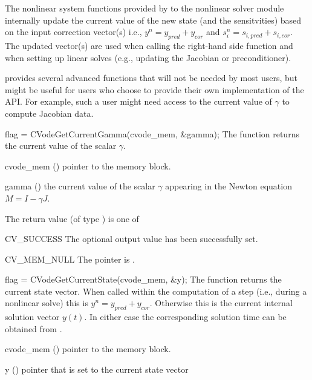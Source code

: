 The nonlinear system functions provided by {\cvodes} to the nonlinear solver
module internally update the current value of the new state (and the
sensitvities) based on the input correction vector(s) i.e.,
$y^n = y_{pred} + y_{cor}$ and $s_i^n = s_{i,pred} + s_{i,cor}$. The updated
vector(s) are used when calling the right-hand side function and when setting
up linear solves (e.g., updating the Jacobian or preconditioner).

{\cvodes} provides several advanced functions that will not be needed by most
users, but might be useful for users who choose to provide their own
implementation of the  API. For example, such a user
might need access to the current value of $\gamma$ to compute Jacobian data.

{
  flag = CVodeGetCurrentGamma(cvode\_mem, \&gamma);
}
{
  The function  returns the current
  value of the scalar $\gamma$.
}
{
  \begin{args}
  \item[cvode\_mem] ()
    pointer to the {\cvodes} memory block.
  \item[gamma] ()
      the current value of the scalar $\gamma$ appearing in the
      Newton equation $M = I - \gamma J$.
  \end{args}
}
{
  The return value  (of type ) is one of
  \begin{args}
  \item[CV\_SUCCESS]
    The optional output value has been successfully set.
  \item[CV\_MEM\_NULL]
    The  pointer is .
  \end{args}
}
{}
{
  flag = CVodeGetCurrentState(cvode\_mem, \&y);
}
{
  The function  returns the current state vector. When
  called within the computation of a step (i.e., during a nonlinear solve) this
  is $y^n = y_{pred} + y_{cor}$. Otherwise this is the current internal solution
  vector $y(t)$. In either case the corresponding solution time can be obtained
  from .
}
{
  \begin{args}
  \item[cvode\_mem] ()
    pointer to the {\cvodes} memory block.
  \item[y] ()
    pointer that is set to the current state vector
  \end{args}
}
